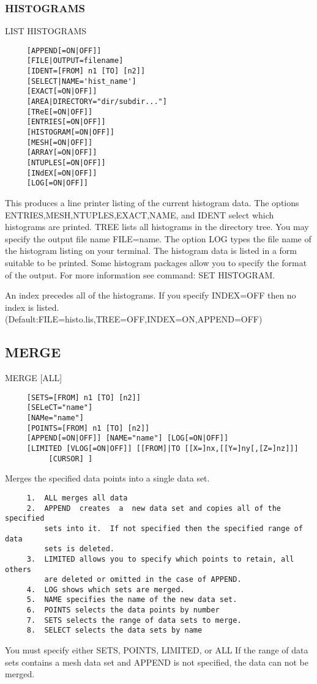 \subsubsection{HISTOGRAMS}

LIST HISTOGRAMS 
\begin{verbatim}
     [APPEND[=ON|OFF]] 
     [FILE|OUTPUT=filename] 
     [IDENT=[FROM] n1 [TO] [n2]] 
     [SELECT|NAME='hist_name'] 
     [EXACT[=ON|OFF]] 
     [AREA|DIRECTORY="dir/subdir..."] 
     [TReE[=ON|OFF]] 
     [ENTRIES[=ON|OFF]] 
     [HISTOGRAM[=ON|OFF]] 
     [MESH[=ON|OFF]] 
     [ARRAY[=ON|OFF]] 
     [NTUPLES[=ON|OFF]] 
     [INdEX[=ON|OFF]] 
     [LOG[=ON|OFF]] 
\end{verbatim}
This produces a line printer listing of the current histogram data.
The options ENTRIES,MESH,NTUPLES,EXACT,NAME, and IDENT select which
histograms are printed.  TREE lists all histograms in the directory
tree.  You may specify the output file name FILE=name.  The option LOG
types the file name of the histogram listing on your terminal.  The
histogram data is listed in a form suitable to be printed.  Some
histogram packages allow you to specify the format of the output.  For
more information see command:  SET HISTOGRAM.  

An index precedes all of the histograms.  If you specify INDEX=OFF then
no index is listed.  
(Default:FILE=histo.lis,TREE=OFF,INDEX=ON,APPEND=OFF) 
\subsection{MERGE}
MERGE [ALL] 
\begin{verbatim}
     [SETS=[FROM] n1 [TO] [n2]] 
     [SELeCT="name"] 
     [NAMe="name"] 
     [POINTS=[FROM] n1 [TO] [n2]] 
     [APPEND[=ON|OFF]] [NAME="name"] [LOG[=ON|OFF]] 
     [LIMITED [VLOG[=ON|OFF]] [[FROM]|TO [[X=]nx,[[Y=]ny[,[Z=]nz]]]
          [CURSOR] ] 
\end{verbatim}

Merges the specified data points into a single data set.  
\begin{verbatim}
     1.  ALL merges all data 
     2.  APPEND  creates  a  new data set and copies all of the specified
         sets into it.  If not specified then the specified range of data
         sets is deleted.  
     3.  LIMITED allows you to specify which points to retain, all others
         are deleted or omitted in the case of APPEND.  
     4.  LOG shows which sets are merged.  
     5.  NAME specifies the name of the new data set.  
     6.  POINTS selects the data points by number 
     7.  SETS selects the range of data sets to merge.  
     8.  SELECT selects the data sets by name 
\end{verbatim}
You  must  specify  either  SETS, POINTS, LIMITED, or ALL If the range of
data sets contains a mesh data set and APPEND is not specified, the  data
can not be merged.  

